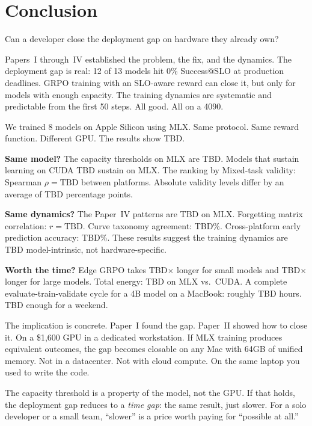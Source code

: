 \documentclass[11pt]{article}
\begin{document}
\section{Conclusion}

Can a developer close the deployment gap on hardware they already own?

Papers~I through~IV established the problem, the fix, and the dynamics.  The deployment gap is real: 12 of 13 models hit 0\% Success@SLO at production deadlines.  GRPO training with an SLO-aware reward can close it, but only for models with enough capacity.  The training dynamics are systematic and predictable from the first 50 steps.  All good.  All on a 4090.

We trained 8 models on Apple Silicon using MLX.  Same protocol.  Same reward function.  Different GPU.  The results show TBD.

\textbf{Same model?}  The capacity thresholds on MLX are TBD.  Models that sustain learning on CUDA TBD sustain on MLX.  The ranking by Mixed-task validity: Spearman $\rho = \text{TBD}$ between platforms.  Absolute validity levels differ by an average of TBD percentage points.

\textbf{Same dynamics?}  The Paper~IV patterns are TBD on MLX.  Forgetting matrix correlation: $r = \text{TBD}$.  Curve taxonomy agreement: TBD\%.  Cross-platform early prediction accuracy: TBD\%.  These results suggest the training dynamics are TBD model-intrinsic, not hardware-specific.

\textbf{Worth the time?}  Edge GRPO takes TBD$\times$ longer for small models and TBD$\times$ longer for large models.  Total energy: TBD on MLX vs.\ CUDA.  A complete evaluate-train-validate cycle for a 4B model on a MacBook: roughly TBD hours.  TBD enough for a weekend.

The implication is concrete.  Paper~I found the gap.  Paper~II showed how to close it.  On a \$1{,}600 GPU in a dedicated workstation.  If MLX training produces equivalent outcomes, the gap becomes closable on any Mac with 64GB of unified memory.  Not in a datacenter.  Not with cloud compute.  On the same laptop you used to write the code.

The capacity threshold is a property of the model, not the GPU.  If that holds, the deployment gap reduces to a \emph{time gap}: the same result, just slower.  For a solo developer or a small team, ``slower'' is a price worth paying for ``possible at all.''
\end{document}
